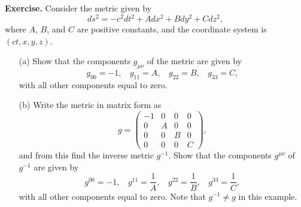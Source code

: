 \documentclass[11pt, a4paper,oneside,openright]{book}
\numberwithin{equation}{section}
\begin{document}
\par\vspace{\baselineskip}

{\bf Exercise.} Consider the metric given by
\begin{equation}
ds^2=-c^2dt^2+Adx^2+Bdy^2+Cdz^2,
\end{equation}
where $A$, $B$, and $C$ are positive constants, and the coordinate system is $(ct,x,y,z)$.
\begin{itemize}
\item [(a)] Show that the components $g_{\mu\nu}$ of the metric are given by
\begin{equation}
g_{00}=-1,~~~~g_{11}=A,~~~~g_{22}=B,~~~~g_{33}=C,
\end{equation}
with all other components equal to zero.
\item [(b)] Write the metric in matrix form as
\begin{equation}
g=\left( \begin{array}{cccc} -1 & 0 & 0 & 0 \\ 
0 & A & 0 & 0 \\
0 & 0 & B & 0 \\
0 & 0 & 0 & C\end{array} \right),
\end{equation}
and from this find the inverse metric $g^{-1}$. Show that the components $g^{\mu\nu}$ of $g^{-1}$ are given by
\begin{equation}
g^{00}=-1,~~~~g^{11}=\frac{1}{A},~~~~g^{22}=\frac{1}{B},~~~~g^{33}=\frac{1}{C},
\end{equation}
with all other components equal to zero. Note that $g^{-1}\neq g$ in this example.
\end{itemize}

\par\vspace{\baselineskip}
\end{document}
